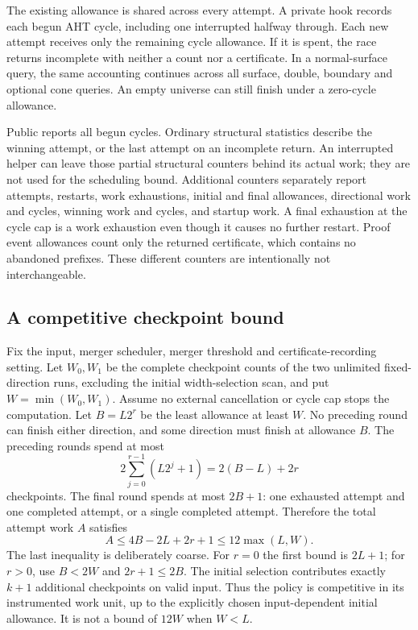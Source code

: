 The existing  allowance is shared across every attempt.
A private hook records each begun AHT cycle, including one interrupted
halfway through. Each new attempt receives only the remaining cycle
allowance. If it is spent, the race returns incomplete with neither a
count nor a certificate. In a normal-surface query, the same accounting
continues across all surface, double, boundary and optional cone queries.
An empty universe can still finish under a zero-cycle allowance.

Public  reports all begun cycles. Ordinary structural statistics
describe the winning attempt, or the last attempt on an incomplete return.
An interrupted helper can leave those partial structural counters behind
its actual work; they are not used for the scheduling bound.
Additional  counters separately report attempts, restarts,
work exhaustions, initial and final allowances, directional work and cycles,
winning work and cycles, and startup work. A final exhaustion at the cycle
cap is a work exhaustion even though it causes no further restart. Proof
event allowances count only the returned certificate, which contains no
abandoned prefixes. These different counters are intentionally not interchangeable.

\subsection{A competitive checkpoint bound}

Fix the input, merger scheduler, merger threshold and certificate-recording
setting. Let $W_0,W_1$ be the complete checkpoint counts of the two unlimited
fixed-direction runs, excluding the initial width-selection scan, and put
$W=\min(W_0,W_1)$. Assume no external cancellation or cycle cap stops the
computation. Let $B=L2^r$ be the least allowance at least $W$.
No preceding round can finish either direction, and some direction must
finish at allowance $B$. The preceding rounds spend at most
\[
 2\sum_{j=0}^{r-1}(L2^j+1)=2(B-L)+2r
\]
checkpoints. The final round spends at most $2B+1$: one exhausted attempt
and one completed attempt, or a single completed attempt. Therefore the
total attempt work $A$ satisfies
\[
 A\leq4B-2L+2r+1\leq12\max(L,W).
\]
The last inequality is deliberately coarse. For $r=0$ the first bound is
$2L+1$; for $r>0$, use $B<2W$ and $2r+1\leq2B$.
The initial selection contributes exactly $k+1$ additional checkpoints on
valid input. Thus the policy is competitive in its instrumented work unit,
up to the explicitly chosen input-dependent initial allowance. It is not
a bound of $12W$ when $W<L$.


